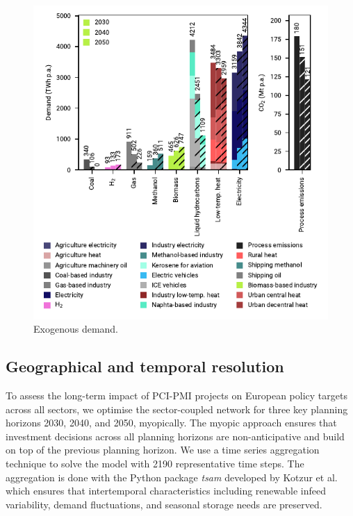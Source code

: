 \documentclass[pdflatex,sn-nature]{sn-jnl}
\theoremstyle{thmstyleone}%
\theoremstyle{thmstyletwo}%
\theoremstyle{thmstylethree}%
\begin{document}
\begin{appendices}
\begin{figure}[htbp]
  \centering
  \includegraphics{figures/exogenous_demand}
  \caption{Exogenous demand.}
  \label{fig:exogenous_demand}
\end{figure}

\subsection*{Geographical and temporal resolution}
To assess the long-term impact of PCI-PMI projects on European policy targets across all sectors, we optimise the sector-coupled network for three key planning horizons 2030, 2040, and 2050, myopically. The myopic approach ensures that investment decisions across all planning horizons are non-anticipative and build on top of the previous planning horizon. We use a time series aggregation technique to solve the model with 2190 representative time steps. The aggregation is done with the Python package \textit{tsam} developed by Kotzur et al. \cite{kotzurImpactDifferentTime2018} which ensures that intertemporal characteristics including renewable infeed variability, demand fluctuations, and seasonal storage needs are preserved.


\end{appendices}
\end{document}
